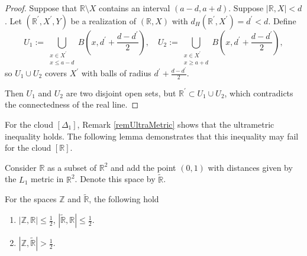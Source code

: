 \documentclass[leqno]{article}
\begin{document}
\begin{proof}
  Suppose that
  $\mathbb{R} \setminus X$ contains an interval $(a-d, a+d)$. Suppose
  $|\mathbb{R}, X|<d$. Let $(\mathbb{R}^{\prime}, X^{\prime}, Y)$ be
  a realization of $(\mathbb{R}, X)$ with $d_H(\mathbb{R}^{\prime},
  X^{\prime}) = d^{\prime}<d$. Define
  $$
  U_1 := \bigcup_{\substack{x \in X^{\prime} \\ x \leq a-d}}
  B\left(x, d^{\prime}+\frac{d-d^{\prime}}{2}\right), \quad
  U_2 := \bigcup_{\substack{x \in X^{\prime} \\ x \geq a+d}}
  B\left(x, d^{\prime}+\frac{d-d^{\prime}}{2}\right),
  $$
  so $U_1 \cup U_2$ covers $X^{\prime}$ with balls of radius
  $d^\prime + \frac{d-d^{\prime}}{2}$.

  Then $U_1$ and $U_2$ are two disjoint open sets, but
  $\mathbb{R}^{\prime} \subset U_1 \cup U_2$, which contradicts the
  connectedness of the real line.
\end{proof}

For the cloud $[\Delta_{1}]$, Remark \ref{remUltraMetric} shows that
the ultrametric inequality holds. The following lemma demonstrates
that this inequality may fail for the cloud $[\mathbb{R}]$.

Consider $\mathbb{R}$ as a subset of $\mathbb{R}^2$ and add the point
$(0,1)$ with distances given by the $L_1$ metric in $\mathbb{R}^2$.
Denote this space by $\widetilde{\mathbb{R}}$.

\begin{theorem}\label{thrmRUltraMetric}
  For the spaces $\mathbb{Z}$ and $\widetilde{\mathbb{R}}$, the
  following hold\/\rom{:}
  \begin{enumerate}
    \item $|\mathbb{Z}, \mathbb{R}| \le \frac{1}{2}$,
      $|\widetilde{\mathbb{R}}, \mathbb{R}| \le \frac{1}{2}$.\label{thrmPt:1}
    \item $|\mathbb{Z}, \widetilde{\mathbb{R}}|>  \frac{1}{2}$.\label{thrmPt:2}
  \end{enumerate}
\end{theorem}
\end{document}
